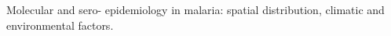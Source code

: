 \documentclass[margin,line]{res}
\begin{document}
\begin{resume}
Molecular and sero- epidemiology in malaria: spatial distribution, climatic and environmental factors.\\
		

\end{resume}
\end{document}
